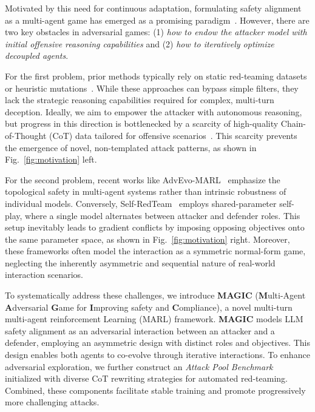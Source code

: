\documentclass[11pt, letterpaper]{template}
\theoremstyle{plain}
\theoremstyle{definition}
\theoremstyle{remark}
\begin{document}
Motivated by this need for continuous adaptation, formulating safety alignment as a multi-agent game has emerged as a promising paradigm~\citep{liu2025chasing,paulus2025safety,wang2025lifelong,wang2025adversarial,zheng2024toward,sun2025texttt}. However, there are two key obstacles in adversarial games: (1) \textit{how to endow the attacker model with initial offensive reasoning capabilities} and (2) \textit{how to iteratively optimize decoupled agents}. 

For the first problem, prior methods typically rely on static red-teaming datasets or heuristic mutations~\citep{liu2023autodan}. While these approaches can bypass simple filters, they lack the strategic reasoning capabilities required for complex, multi-turn deception. Ideally, we aim to empower the attacker with autonomous reasoning, but progress in this direction is bottlenecked by a scarcity of high-quality Chain-of-Thought (CoT) data tailored for offensive scenarios~\citep{chao2023twentyqueries}. This scarcity prevents the emergence of novel, non-templated attack patterns, as shown in Fig.~\ref{fig:motivation} left. 

For the second problem, recent works like AdvEvo-MARL~\citep{pan2025advevo} emphasize the topological safety in multi-agent systems rather than intrinsic robustness of individual models. Conversely, Self-RedTeam~\citep{liu2025chasing} employs shared-parameter self-play, where a single model alternates between attacker and defender roles. This setup inevitably leads to gradient conflicts by imposing opposing objectives onto the same parameter space, as shown in Fig.~\ref{fig:motivation} right.
Moreover, these frameworks often model the interaction as a symmetric normal-form game, neglecting the inherently asymmetric and sequential nature of real-world interaction scenarios.

To systematically address these challenges, we introduce \textbf{MAGIC} (\textbf{M}ulti-Agent \textbf{A}dversarial \textbf{G}ame for \textbf{I}mproving safety and \textbf{C}ompliance), a novel multi-turn  multi-agent reinforcement Learning (MARL) framework. \textbf{MAGIC} models LLM safety alignment as an adversarial interaction between an attacker and a defender, employing an asymmetric design with distinct roles and objectives. This design enables both agents to co-evolve through iterative interactions. To enhance adversarial exploration, we further construct an \textit{Attack Pool Benchmark} initialized with diverse CoT rewriting strategies for automated red-teaming. Combined, these components facilitate stable training and promote progressively more challenging attacks.
\end{document}
